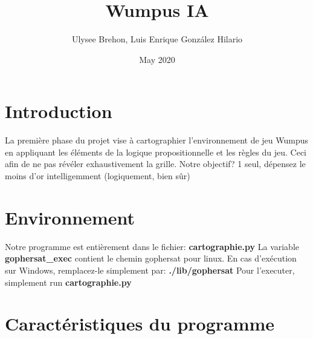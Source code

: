 \documentclass{article}
\title{Wumpus IA}
\author{Ulysee Brehon, Luis Enrique González Hilario}
\date{May 2020}
\begin{document}
\maketitle
\tableofcontents

\section{Introduction}
La première phase du projet vise à cartographier l'environnement de jeu Wumpus en appliquant les éléments de la logique propositionnelle et les règles du jeu. Ceci afin de ne pas révéler exhaustivement la grille.
Notre objectif? 1 seul, dépensez le moins d'or intelligemment (logiquement, bien sûr)

\section{Environnement}

Notre programme est entièrement dans le fichier: \textbf{cartographie.py}
\newline \newline
La variable \textbf{gophersat\_exec} contient le chemin gophersat pour linux. En cas d'exécution sur Windows, remplacez-le simplement par: \textbf{./lib/gophersat}
\newline \newline
Pour l'executer, simplement run \textbf{cartographie.py}

\section{Caractéristiques du programme}
\end{document}
